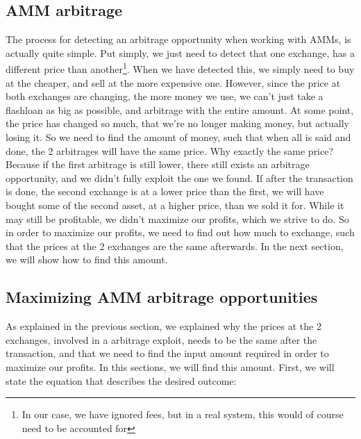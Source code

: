 \subsection{AMM arbitrage}
The process for detecting an arbitrage opportunity when working with AMMs, is
actually quite simple. Put simply, we just need to detect that one exchange, has
a different price than another\footnote{In our case, we have ignored fees, but
in a real system, this would of course need to be accounted for}. When we have
detected this, we simply need to buy at the cheaper, and sell at the more
expensive one. However, since the price at both exchanges are changing, the more
money we use, we can't just take a flashloan as big as possible, and arbitrage
with the entire amount. At some point, the price has changed so much, that we're
no longer making money, but actually losing it. So we need to find the amount of
money, such that when all is said and done, the 2 arbitrages will have the same
price. Why exactly the same price? Because if the first arbitrage is still
lower, there still exists an arbitrage opportunity, and we didn't fully exploit
the one we found. If after the transaction is done, the second exchange is at a
lower price than the first, we will have bought some of the second asset, at a
higher price, than we sold it for. While it may still be profitable, we didn't
maximize our profits, which we strive to do. So in order to maximize our
profits, we need to find out how much to exchange, such that the prices at the 2
exchanges are the same afterwards. In the next section, we will show how to find
this amount.

\subsection{Maximizing AMM arbitrage opportunities}\label{maximizing}
As explained in the previous section, we explained why the prices at the 2
exchanges, involved in a arbitrage exploit, needs to be the same after the
transaction, and that we need to find the input amount required in order to
maximize our profits. In this sections, we will find this amount. First, we will
state the equation that describes the desired outcome:

